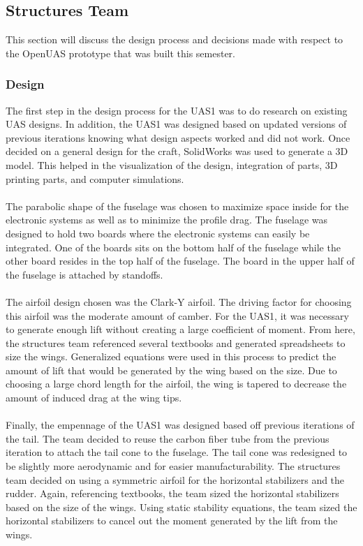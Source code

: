 \documentclass{article}
\begin{document}
\subsection{Structures Team}
This section will discuss the design process and decisions made with respect to the OpenUAS prototype that was built this semester.

\subsubsection{Design}
The first step in the design process for the UAS1 was to do research on existing UAS designs. In addition, the UAS1 was designed based on updated versions of previous iterations knowing what design aspects worked and did not work. Once decided on a general design for the craft, SolidWorks was used to generate a 3D model. This helped in the visualization of the design, integration of parts, 3D printing parts, and computer simulations.\\\\
The parabolic shape of the fuselage was chosen to maximize space inside for the electronic systems as well as to minimize the profile drag. The fuselage was designed to hold two boards where the electronic systems can easily be integrated. One of the boards sits on the bottom half of the fuselage while the other board resides in the top half of the fuselage. The board in the upper half of the fuselage is attached by standoffs.\\\\
The airfoil design chosen was the Clark-Y airfoil. The driving factor for choosing this airfoil was the moderate amount of camber. For the UAS1, it was necessary to generate enough lift without creating a large coefficient of moment. From here, the structures team referenced several textbooks and generated spreadsheets to size the wings. Generalized equations were used in this process to predict the amount of lift that would be generated by the wing based on the size. Due to choosing a large chord length for the airfoil, the wing is tapered to decrease the amount of induced drag at the wing tips.\\\\
Finally, the empennage of the UAS1 was designed based off previous iterations of the tail. The team decided to reuse the carbon fiber tube from the previous iteration to attach the tail cone to the fuselage. The tail cone was redesigned to be slightly more aerodynamic and for easier manufacturability. The structures team decided on using a symmetric airfoil for the horizontal stabilizers and the rudder. Again, referencing textbooks, the team sized the horizontal stabilizers based on the size of the wings. Using static stability equations, the team sized the horizontal stabilizers to cancel out the moment generated by the lift from the wings.\\\\
\end{document}
